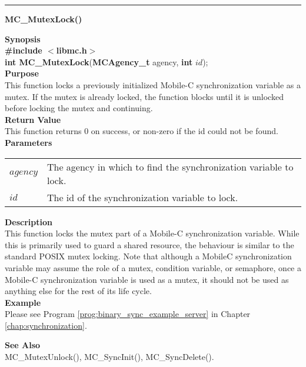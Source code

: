 \noindent
\vspace{5pt}
\rule{6.5in}{0.015in}
\noindent
{}
{\LARGE \bf MC\_MutexLock()}\\
\label{api:MC_MutexLock()}

\noindent
{\bf Synopsis}\\
{\bf \#include $<$libmc.h$>$}\\
{\bf int MC\_MutexLock}({\bf MCAgency\_t} agency, {\bf int} $id$);\\

\noindent
{\bf Purpose}\\
This function locks a previously initialized Mobile-C synchronization variable 
as a mutex. 
If the mutex is already locked, the function blocks until it is
unlocked before locking the mutex and continuing. \\

\noindent
{\bf Return Value}\\
This function returns 0 on success, or non-zero if the id could not be found. \\

\noindent
{\bf Parameters}
\vspace{-0.1pt}
\begin{description}
\item
\begin{tabular}{p{10 mm}p{145 mm}} 
$agency$ & The agency in which to find the synchronization variable to lock.\\
$id$ & The id of the synchronization variable to lock. 
\end{tabular}
\end{description}

\noindent
{\bf Description}\\
This function locks the mutex part of a Mobile-C synchronization variable. 
While this is primarily used to guard a shared resource, the behaviour is 
similar to the standard POSIX mutex locking. 
Note that although a MobileC synchronization variable may assume the role of a 
mutex, condition variable, or semaphore, once a Mobile-C synchronization 
variable is used as a mutex, it should not be used as anything else for the 
rest of its life cycle.\\ 

\noindent
{\bf Example}\\
Please see Program \vref{prog:binary_sync_example_server} in 
Chapter \ref{chap:synchronization}.\\

\noindent

\noindent
{\bf See Also}\\
MC\_MutexUnlock(), MC\_SyncInit(), MC\_SyncDelete().\\

